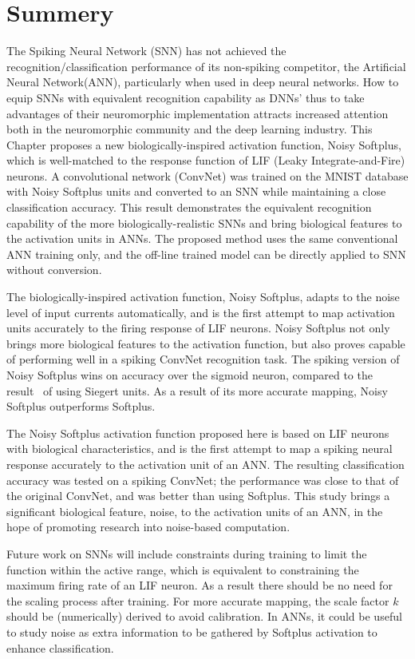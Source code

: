 \section{Summery}
	The Spiking Neural Network (SNN) has not achieved the recognition/classification performance of its non-spiking competitor, the Artificial Neural Network(ANN), particularly when used in deep neural networks.
	How to equip SNNs with equivalent recognition capability as DNNs' thus to take advantages of their neuromorphic implementation attracts increased attention both in the neuromorphic community and the deep learning industry.
	This Chapter proposes a new biologically-inspired activation function, Noisy Softplus, which is well-matched to the response function of LIF (Leaky Integrate-and-Fire) neurons.
	A convolutional network (ConvNet) was trained on the MNIST database with Noisy Softplus units and converted to an SNN while maintaining a close classification accuracy.
	This result demonstrates the equivalent recognition capability of the more biologically-realistic SNNs and bring biological features to the activation units in ANNs.
	The proposed method uses the same conventional ANN training only, and the off-line trained model can be directly applied to SNN without conversion.
	
	The biologically-inspired activation function, Noisy Softplus, adapts to the noise level of input currents automatically, and is the first attempt to map activation units accurately to the firing response of LIF neurons.
	Noisy Softplus not only brings more biological features to the activation function, but also proves capable of performing well in a spiking ConvNet recognition task.
	The spiking version of Noisy Softplus wins on accuracy over the sigmoid neuron, compared to the result~\cite{Stromatias2015scalable} of using Siegert units.
	As a result of its more accurate mapping, Noisy Softplus outperforms Softplus.
	
	The Noisy Softplus activation function proposed here is based on LIF neurons with biological characteristics, and is the first attempt to map a spiking neural response accurately to the activation unit of an ANN.
	The resulting classification accuracy was tested on a spiking ConvNet; the performance was close to that of the original ConvNet, and was better than using Softplus.
	This study brings a significant biological feature, noise, to the activation units of an ANN, in the hope of promoting research into noise-based computation.
	
	Future work on SNNs will include constraints during training to limit the function within the active range, which is equivalent to constraining the maximum firing rate of an LIF neuron.
	As a result there should be no need for the scaling process after training.
	For more accurate mapping, the scale factor $k$ should be (numerically) derived to avoid calibration.
	In ANNs, it could be useful to study noise as extra information to be gathered by Softplus activation to enhance classification.